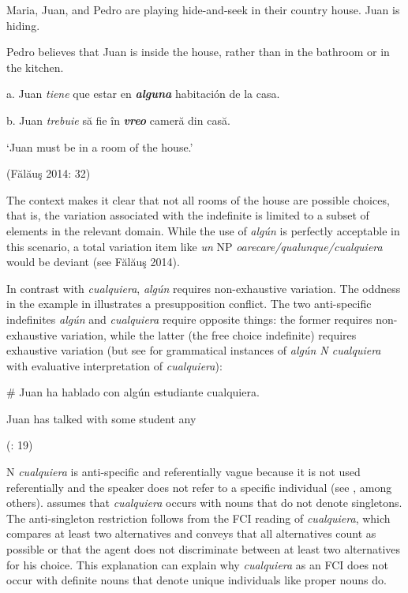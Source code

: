 \documentclass[output=paper]{langscibook}
\begin{document}
\label{bkm:Ref533761939}  Maria, Juan, and Pedro are playing hide-and-seek in their country house. Juan is hiding. 

Pedro believes that Juan is inside the house, rather than in the bathroom or in the kitchen.

  a.  Juan \textit{tiene} que estar en \textbf{\textit{alguna}} habitación de la casa.

  b.  Juan \textit{trebuie} să fie în \textbf{\textit{vreo}} cameră din casă.

    ‘Juan must be in a room of the house.’

    (Fălăuş 2014: 32)

The context makes it clear that not all rooms of the house are possible choices, that is, the variation associated with the indefinite is limited to a subset of elements in the relevant domain. While the use of \textit{algún} is perfectly acceptable in this scenario, a total variation item like \textit{un} NP \textit{oarecare/qualunque/cualquiera} would be deviant (see Fălăuş 2014).

  In contrast with \textit{cualquiera}, \textit{algún} requires non-exhaustive variation. The oddness in the example in  illustrates a presupposition conflict. The two anti-specific indefinites \textit{algún} and \textit{cualquiera} require opposite things: the former requires non-exhaustive variation, while the latter (the free choice indefinite) requires exhaustive variation (but see  for grammatical instances of \textit{algún N cualquiera} with evaluative interpretation of \textit{cualquiera}):

\label{bkm:Ref533761963}  \# Juan ha hablado con algún estudiante cualquiera.

  Juan has talked with some student any 

  (\citealt{EtxeberriaGiannakidou2017}: 19)

N \textit{cualquiera} is anti-specific and referentially vague because it is not used referentially and the speaker does not refer to a specific individual (see \citealt{GiannakidouQuer2013}, among others). \citet{Menéndez-Benito2010} assumes that \textit{cualquiera} occurs with nouns that do not denote singletons. The anti-singleton restriction follows from the FCI reading of \textit{cualquiera}, which compares at least two alternatives and conveys that all alternatives count as possible or that the agent does not discriminate between at least two alternatives for his choice. This explanation can explain why \textit{cualquiera} as an FCI does not occur with definite nouns that denote unique individuals like proper nouns do. 
\end{document}
